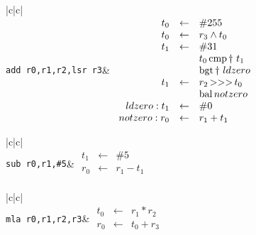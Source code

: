 \vspace{0.3cm}

{\centering \begin{tabular}{|c|c|}
\hline 
{}\\
\hline 
\hline 
{\tt add r0,r1,r2,lsr r3}&
\( \begin{array}{rcl}
t_0 & \leftarrow & \#255\\
t_0 & \leftarrow & r_3 \wedge t_0\\
t_1 & \leftarrow & \#31\\
 & & t_0 \mathop{\rm cmp}\dagger\ t_1\\
 & & \mathop{\rm bgt}\dagger\ ldzero\\
t_1 & \leftarrow & r_2 \mathop{\rm >>>} t_0\\
 & & \mathop{\rm bal} notzero\\
ldzero: t_1 & \leftarrow & \#0\\
notzero: r_0 & \leftarrow & r_1 + t_1\\
\end{array} \)\\
\hline 
\end{tabular}\par}

\vspace{0.3cm}

{\centering \begin{tabular}{|c|c|}
\hline 
{}\\
\hline 
\hline 
{\tt sub r0,r1,\#5}&
\( \begin{array}{rcl}
t_1 & \leftarrow & \#5\\
r_0 & \leftarrow & r_1 - t_1\\
\end{array} \)\\
\hline 
\end{tabular}\par}

\vspace{0.3cm}

{\centering \begin{tabular}{|c|c|}
\hline 
{}\\
\hline 
\hline 
{\tt mla r0,r1,r2,r3}&
\( \begin{array}{rcl}
t_0 & \leftarrow & r_1 * r_2\\
r_0 & \leftarrow & t_0 + r_3\\
\end{array} \)\\
\hline 
\end{tabular}\par}

